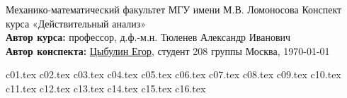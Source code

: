 \documentclass[a4paper, 12pt]{article}
\theoremstyle{plain}
\theoremstyle{definition}
\theoremstyle{remark}
\numberwithin{equation}{section}
\begin{document}
\begin{titlepage}
    \begin{center}
        \large Механико-математический факультет МГУ имени М.В. Ломоносова
        \vfill
        \Large Конспект курса «Действительный анализ» \bigskip \\
        \large \textbf{Автор курса:} профессор, д.ф.-м.н. Тюленев Александр Иванович \\
        \textbf{Автор конспекта:} \href{https://github.com/betel-git}{Цыбулин Егор}, студент 208 группы
        \vfill
        Москва, \today
    \end{center}
\end{titlepage}
\tableofcontents
\newpage

\fontsize{14pt}{20pt}\selectfont

{c01.tex}
\newpage
{c02.tex}
\newpage
{c03.tex}
\newpage
{c04.tex}
\newpage
{c05.tex}
\newpage
{c06.tex}
\newpage
{c07.tex}
\newpage
{c08.tex}
\newpage
{c09.tex}
\newpage
{c10.tex}
\newpage
{c11.tex}
\newpage
{c12.tex}
\newpage
{c13.tex}
\newpage
{c14.tex}
\newpage
{c15.tex}
\newpage
{c16.tex}
\newpage
\end{document}
